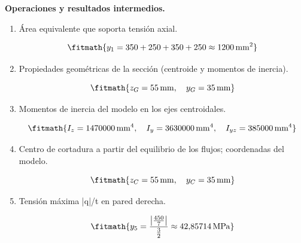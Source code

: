 \noindent\textbf{Operaciones y resultados intermedios.}

\begin{enumerate}

\item Área equivalente que soporta tensión axial.

\[\fitmath{y_{1}=350+250+350+250\approx 1200\,\mathrm{mm^{2}}}\]

\item Propiedades geométricas de la sección (centroide y momentos de inercia).

\[\fitmath{z_G=55\,\mathrm{mm},\quad y_G=35\,\mathrm{mm}}\]

\item Momentos de inercia del modelo en los ejes centroidales.

\[\fitmath{I_z=1470000\,\mathrm{mm}^{4},\quad I_y=3630000\,\mathrm{mm}^{4},\quad I_{yz}=385000\,\mathrm{mm}^{4}}\]

\item Centro de cortadura a partir del equilibrio de los flujos; coordenadas del modelo.

\[\fitmath{z_C=55\,\mathrm{mm},\quad y_C=35\,\mathrm{mm}}\]

\item Tensión máxima |q|/t en pared derecha.

\[\fitmath{y_{5}=\frac{\left|\frac{450}{7}\right|}{\frac{3}{2}}\approx 42{,}85714\,\mathrm{MPa}}\]

\end{enumerate}
